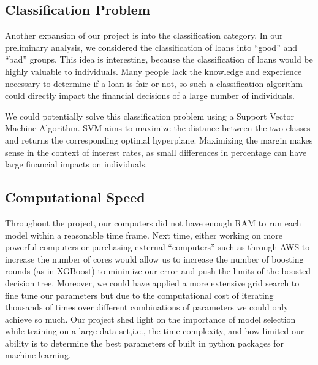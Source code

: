 \documentclass[twocolumn]{article}
\begin{document}
\subsection{Classification Problem}
\par{\hspace{18}Another expansion of our project is into the classification category. In our preliminary analysis, we considered the classification of loans into “good” and “bad” groups. This idea is interesting, because the classification of loans would be highly valuable to individuals. Many people lack the knowledge and experience necessary to determine if a loan is fair or not, so such a classification algorithm could directly impact the financial decisions of a large number of individuals.}
\par{We could potentially solve this classification problem using a Support Vector Machine Algorithm. SVM aims to maximize the distance between the two classes and returns the corresponding optimal hyperplane. Maximizing the margin makes sense in the context of interest rates, as small differences in percentage can have large financial impacts on individuals. }

\subsection{Computational Speed}
\par{\hspace{18}Throughout the project, our computers did not have enough RAM to run each model within a reasonable time frame. Next time, either working on more powerful computers or purchasing external “computers” such as through AWS to increase the number of cores would allow us to increase the number of boosting rounds (as in XGBoost) to minimize our error and push the limits of the boosted decision tree. Moreover, we could have applied a more extensive grid search to fine tune our parameters but due to the computational cost of iterating thousands of times over different combinations of parameters we could only achieve so much. Our project shed light on the importance of model selection while training on a large data set,i.e., the time complexity, and how limited our ability is to determine the best parameters of built in python packages for machine learning.}
\end{document}
